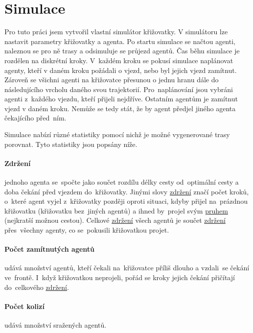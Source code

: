\section{Simulace}\label{sec:simulace}

%

Pro tuto práci jsem vytvořil vlastní simulátor křižovatky.
V simulátoru lze nastavit parametry křižovatky a agenta.
Po startu simulace se načtou agenti, naleznou se pro ně trasy a odsimuluje se průjezd agentů.
Čas běhu simulace je rozdělen na diskrétní kroky.
V~každém kroku se pokusí simulace naplánovat agenty, kteří v daném kroku požádali o vjezd, nebo byl jejich vjezd zamítnut.
Zároveň se všichni agenti na křižovatce přesunou o jednu hranu dále do následujícího vrcholu daného svou trajektorií.
Pro~naplánování jsou vybráni agenti z~každého vjezdu, kteří přijeli nejdříve.
Ostatním agentům je zamítnut vjezd v daném kroku.
Nemůže se tedy stát, že by agent předjel jiného agenta čekajícího před~ním.

Simulace nabízí různé statistiky pomocí nichž je možné vygenerované trasy porovnat.
Tyto statistiky jsou popsány níže.

\paragraph{Zdržení} \label{par:zdrzeni} jednoho agenta se~spočte jako součet
rozdílu délky cesty od~optimální cesty a doba čekání před vjezdem do~křižovatky.
Jinými slovy \hyperref[item:zdrzeni]{zdržení} značí počet kroků, o~které agent vyjel z~křižovatky později oproti situaci,
kdyby přijel na~prázdnou křižovatku (křižovatku bez~jiných agentů) a
ihned by~projel svým \hyperref[par:pruh]{pruhem} (nejkratší možnou cestou).
Celkové \hyperref[item:zdrzeni]{zdržení} všech agentů je součet \hyperref[item:zdrzeni]{zdržení} přes~všechny agenty,
co se~pokusili křižovatkou projet.

\paragraph{Počet zamítnutých agentů}\label{par:zamitnuti} udává množství agentů, kteří čekali na~křižovatce příliš dlouho a
vzdali~se čekání ve~frontě.
I~když křižovatkou neprojeli, pořád se kroky jejich čekání přičítají do~celkového \hyperref[item:zdrzeni]{zdržení}.

\paragraph{Počet kolizí}\label{par:kolize} udává množství sražených agentů.

